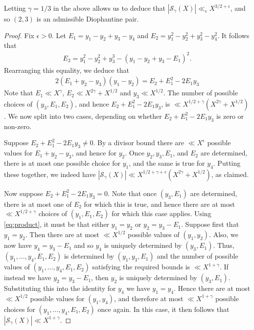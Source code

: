 \documentclass[11pt,reqno]{amsart}
\numberwithin{equation}{section}
\begin{document}
Letting $\gamma = 1/3$ in the above allows us to deduce that $|\mathcal{S}_{\gamma}(X)| \ll_{\epsilon} X^{3/2+\epsilon}$, and so $(2,3)$ is an admissible Diophantine pair. 

\begin{proof} Fix $\epsilon > 0$. Let $E_1 = y_1-y_2+y_3-y_4$ and $E_2 = y_1^2-y_2^2+y_3^2-y_4^2$. It follows that
\begin{align*} 
E_2 = y_1^2-y_{2}^2 +y_3^3-(y_1-y_2+y_3-E_1)^2.
\end{align*}
Rearranging this equality, we deduce that 
\begin{align} \label{eq:product}
2(E_1+y_{2}-y_3)(y_1-y_{2})=E_2+E_1^2-2E_1y_3 
\end{align}
Note that $E_1 \ll X^{\gamma}$, $E_2 \ll X^{2\gamma}+X^{1/2}$ and $y_3 \ll X^{1/2}$. The number of possible choices of $(y_3,E_1,E_2)$, and hence $E_2+E_1^2-2E_1y_3$, is $\ll X^{1/2+\gamma}(X^{2\gamma}+X^{1/2})$. We now split into two cases, depending on whether $E_2+E_1^2-2E_1y_3$ is zero or non-zero. 

Suppose $E_2+E_1^2-2E_1y_3\neq 0$. By a divisor bound there are $\ll X^{\epsilon}$ possible values for $E_1+y_{2}-y_3$, and hence for $y_{2}$. Once $y_{2}, y_3, E_1$, and $E_2$ are determined, there is at most one possible choice for $y_1$, and the same is true for $y_{4}$. Putting these together, we indeed have $|\mathcal{S}_{\gamma}(X)| \ll X^{1/2+\gamma+\epsilon}(X^{2\gamma}+X^{1/2})$, as claimed. 

Now suppose $E_2+E_1^2-2E_1y_3 = 0$. Note that once $(y_3,E_1)$ are determined, there is at most one of $E_2$ for which this is true, and hence there are at most $\ll X^{1/2+\gamma}$ choices of $(y_1,E_1,E_2)$ for which this case applies. Using \eqref{eq:product}, it must be that either $y_1 = y_2$ or $y_2 = y_3-E_1$. Suppose first that $y_1=y_2$. Then there are at most $\ll X^{1/2}$ possible values of $(y_1,y_2)$. Also, we now have $y_4 = y_3-E_1$ and so $y_4$ is uniquely determined by $(y_3,E_1)$. Thus, $(y_1,\ldots,y_4,E_1,E_2)$ is determined by $(y_1,y_3,E_1)$ and the number of possible values of $(y_1,\ldots,y_4,E_1,E_2)$ satisfying the required bounds is $\ll X^{1+\gamma} $. If instead we have $y_2=y_3-E_1$, then $y_2$ is uniquely determined by $(y_3,E_1)$. Substituting this into the identity for $y_4$ we have $y_1 = y_4$. Hence there are at most $\ll X^{1/2}$ possible values for $(y_1,y_4)$, and therefore at most $\ll X^{1+\gamma}$ possible choices for $(y_1,\ldots,y_4,E_1,E_2)$ once again. In this case, it then follows that $|\mathcal{S}_{\gamma}(X)| \ll X^{1+\gamma}$. 
\end{proof}
\end{document}
